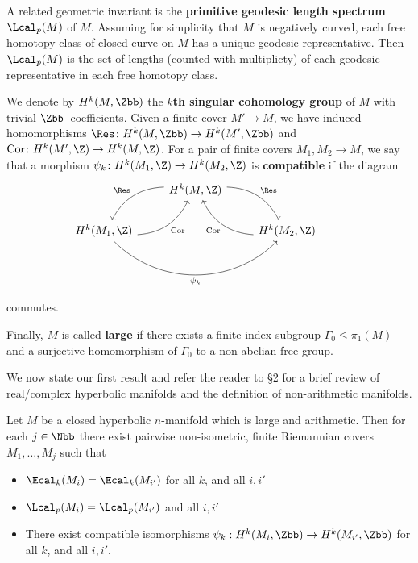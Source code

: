 \documentclass[12pt]{article}
\theoremstyle{plain}
\theoremstyle{remark}
\DeclareMathOperator{\Cor}{Cor}\DeclareMathOperator{\Mot}{Mot}
\begin{document}
A related geometric invariant is the {\bf primitive geodesic length spectrum} $\Lcal_p(M)$ of $M$. Assuming for simplicity that $M$ is negatively curved, each free homotopy class of closed curve on $M$ has a unique geodesic representative. Then $\Lcal_p(M)$ is the set of lengths (counted with multiplicty) of each geodesic representative in each free homotopy class.

We denote by $H^k( M,\Zbb )$ the {\bf $k$th singular cohomology group} of $M$ with trivial $\Zbb$--coefficients. Given a finite cover $M' \to M$, we have induced homomorphisms $\Res\colon H^k(M,\Zbb) \to H^k(M',\Zbb)$ and $\Cor\colon H^k(M',\Z) \to H^k(M,\Z)$. For a pair of finite covers $M_1,M_2 \to M$, we say that a morphism $\psi_k\colon H^k(M_1,\Z) \to H^k(M_2,\Z)$ is \textbf{compatible} if the diagram
\begin{equation}\label{Eq:Natural}
	\begin{tikzcd}
		& H^k(M,\Z) \arrow[rd,"\Res", bend left = 30] \arrow[ld,"\Res"', bend right = 30] & \\ H^k(M_1,\Z) \arrow[rr,"\psi_k"', bend right = 45] \arrow[ru,"\Cor"', bend right = 30]  & & H^k(M_2,\Z) \arrow[lu,"\Cor", bend left = 30]&
	\end{tikzcd}
\end{equation}

commutes.

Finally, $M$ is called \textbf{large} if there exists a finite index subgroup $\Gamma_0 \leq \pi_1(M)$ and a surjective homomorphism of $\Gamma_0$ to a non-abelian free group.

We now state our first result and refer the reader to \S 2 for a brief review of real/complex hyperbolic manifolds and the definition of non-arithmetic manifolds.

\begin{thm}
	Let $M$ be a closed hyperbolic $n$-manifold which is large and arithmetic. Then for each $j\in \Nbb$ there exist pairwise non-isometric, finite Riemannian covers $M_1, \dots, M_j$ such that
	\begin{itemize}
		\item $\Ecal_k(M_i) = \Ecal_k(M_{i'})$ for all $k$, and all $i,i'$
		\item $\Lcal_p(M_i) = \Lcal_p(M_{i'})$ and all $i,i'$
		\item There exist compatible isomorphisms $\psi_k : H^k(M_i,\Zbb) \to H^k(M_{i'},\Zbb)$ for all $k$, and all $i,i'.$
	\end{itemize}
\end{thm}
\end{document}
